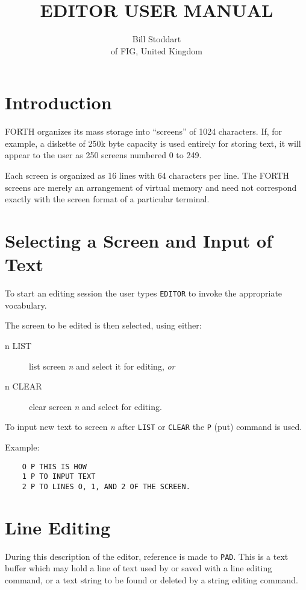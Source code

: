 \documentclass{article}
\title{EDITOR USER MANUAL}
\author{Bill Stoddart\\of FIG, United Kingdom}
\date{} %
\newcommand{\n}{\textit{n}}
\begin{document}
\maketitle
\begin{multicols}{2}[]
	\setlength{\parskip}{.5em}
	\setlength\parindent{0pt}
	\section{Introduction}
	FORTH organizes its mass storage into ``screens'' of 1024 characters.
	If, for example, a diskette of 250k byte capacity is used entirely
	for storing text, it will appear to the user as 250 screens
	numbered 0 to 249.

	Each screen is organized as 16 lines with 64 characters per line.
	The FORTH screens are merely an arrangement of virtual memory and
	need not correspond exactly with the screen format of a particular
	terminal.

	\section{Selecting a Screen and Input of Text}

	To start an editing session the user types \verb|EDITOR| to invoke the
	appropriate vocabulary.

	The screen to be edited is then selected, using either:
	\begin{description}
	\item[n LIST]
		list screen \n{} and select it for editing, \textit{or}
	\item[n CLEAR]
		clear screen \n{} and select for editing.
	\end{description}

	To input new text to screen \n{} after \verb|LIST| or \verb|CLEAR|
	the \verb|P| (put) command is used.

	Example:
	\begin{verbatim}
	O P THIS IS HOW
	1 P TO INPUT TEXT
	2 P TO LINES O, 1, AND 2 OF THE SCREEN.
	\end{verbatim}

	\section{Line Editing}

	During this description of the editor, reference is made to \verb|PAD|.
	This is a text buffer which may hold a line of text used by or
	saved with a line editing command, or a text string to be found or
	deleted by a string editing command.


\end{multicols}
\end{document}
